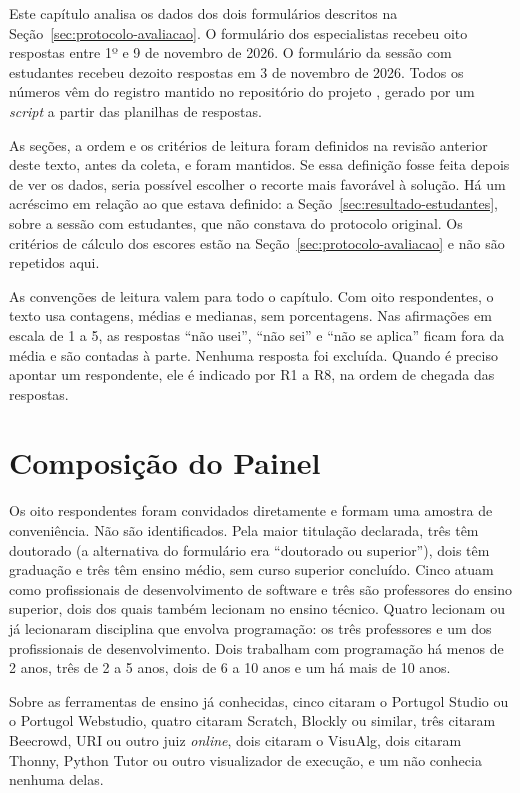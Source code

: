 Este capítulo analisa os dados dos dois formulários descritos na Seção~\ref{sec:protocolo-avaliacao}. O formulário dos especialistas recebeu oito respostas entre 1º e 9 de novembro de 2026. O formulário da sessão com estudantes recebeu dezoito respostas em 3 de novembro de 2026. Todos os números vêm do registro mantido no repositório do projeto \cite{silva2026avaliacao}, gerado por um \textit{script} a partir das planilhas de respostas.

As seções, a ordem e os critérios de leitura foram definidos na revisão anterior deste texto, antes da coleta, e foram mantidos. Se essa definição fosse feita depois de ver os dados, seria possível escolher o recorte mais favorável à solução. Há um acréscimo em relação ao que estava definido: a Seção~\ref{sec:resultado-estudantes}, sobre a sessão com estudantes, que não constava do protocolo original. Os critérios de cálculo dos escores estão na Seção~\ref{sec:protocolo-avaliacao} e não são repetidos aqui.

As convenções de leitura valem para todo o capítulo. Com oito respondentes, o texto usa contagens, médias e medianas, sem porcentagens. Nas afirmações em escala de 1 a 5, as respostas ``não usei'', ``não sei'' e ``não se aplica'' ficam fora da média e são contadas à parte. Nenhuma resposta foi excluída. Quando é preciso apontar um respondente, ele é indicado por R1 a R8, na ordem de chegada das respostas.

\section{Composição do Painel}
\label{sec:resultado-painel}

Os oito respondentes foram convidados diretamente e formam uma amostra de conveniência. Não são identificados. Pela maior titulação declarada, três têm doutorado (a alternativa do formulário era ``doutorado ou superior''), dois têm graduação e três têm ensino médio, sem curso superior concluído. Cinco atuam como profissionais de desenvolvimento de software e três são professores do ensino superior, dois dos quais também lecionam no ensino técnico. Quatro lecionam ou já lecionaram disciplina que envolva programação: os três professores e um dos profissionais de desenvolvimento. Dois trabalham com programação há menos de 2 anos, três de 2 a 5 anos, dois de 6 a 10 anos e um há mais de 10 anos.

Sobre as ferramentas de ensino já conhecidas, cinco citaram o Portugol Studio ou o Portugol Webstudio, quatro citaram Scratch, Blockly ou similar, três citaram Beecrowd, URI ou outro juiz \textit{online}, dois citaram o VisuAlg, dois citaram Thonny, Python Tutor ou outro visualizador de execução, e um não conhecia nenhuma delas.

